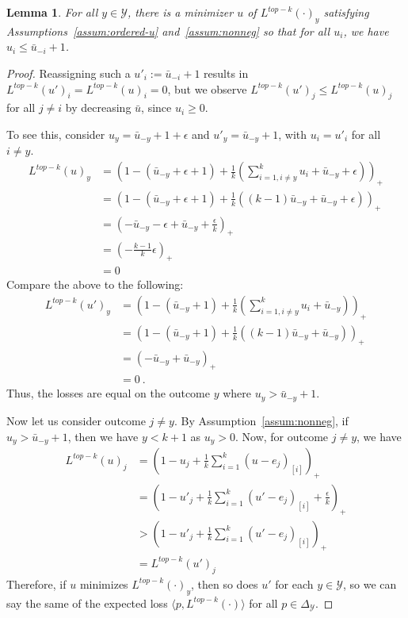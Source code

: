 \documentclass[12pt]{article}
\newcommand{\ubar}{\bar{u}}
\newcommand{\simplex}{\Delta_\Y}
\newcommand{\Y}{\mathcal{Y}}
\newcommand{\inprod}[2]{\langle #1, #2 \rangle}%
\newtheorem{lemma}{Lemma}
\begin{document}
\begin{lemma}\label{lem:top-threshold}
	For all $y \in \Y$, there is a minimizer $u$ of $L^{top-k}(\cdot)_y$ satisfying Assumptions~\ref{assum:ordered-u} and~\ref{assum:nonneg} so that for all $u_i$, we have $u_i \leq \bar u_{-i} +1$. 
\end{lemma}
\begin{proof}
	Reassigning such a $u'_i := \bar u_{-i} +1$ results in $L^{top-k}(u')_i = L^{top-k}(u)_i = 0$, but we observe $L^{top-k}(u')_j \leq L^{top-k}(u)_j$ for all $j \neq i$ by decreasing $\ubar$, since $u_i \geq 0$.

To see this, consider $u_y = \bar u_{-y} + 1 + \epsilon$ and $u'_y = \bar u_{-y} + 1$, with $u_i = u'_i$ for all $i \neq y$. 
\begin{align*}
L^{top-k}(u)_y &= \left(1 - (\bar u_{-y} + \epsilon + 1) + \frac 1 k \left(\sum_{i=1, i \neq y}^k u_i + \bar u_{-y} + \epsilon\right) \right)_+\\ 
&= \left(1 - (\bar u_{-y} + \epsilon + 1) + \frac 1 k \left((k-1) \bar u_{-y} + \bar u_{-y} + \epsilon\right) \right)_+\\
&= \left(-\bar u_{-y} - \epsilon + \bar u_{-y} + \frac \epsilon k \right)_+ \\
&= (-\frac{k-1}{k}\epsilon)_+\\
&= 0
\end{align*}
Compare the above to the following:
\begin{align*}
L^{top-k}(u')_y &= \left(1 - (\bar u_{-y} + 1) + \frac 1 k \left(\sum_{i=1, i \neq y}^k u_i + \bar u_{-y} \right) \right)_+\\ 
&= \left(1 - (\bar u_{-y} + 1) + \frac 1 k \left((k-1) \bar u_{-y} + \bar u_{-y} \right) \right)_+\\
&= \left(-\bar u_{-y} + \bar u_{-y}\right)_+ \\
&= 0~.~
\end{align*}
Thus, the losses are equal on the outcome $y$ where $u_y > \bar u_{-y} + 1$.

Now let us consider outcome $j \neq y$.
By Assumption~\ref{assum:nonneg}, if $u_y > \bar u_{-y} + 1$, then we have $y < k+1$ as $u_y > 0$.
Now, for outcome $j \neq y$, we have 
\begin{align*}
L^{top-k}(u)_j &= \left( 1 - u_j + \frac 1 k \sum_{i=1}^k (u-e_j)_{[i]} \right)_+\\
	&= \left( 1 - u'_j + \frac 1 k \sum_{i=1}^k (u'-e_j)_{[i]} + \frac {\epsilon}{k}\right)_+\\
	&> \left( 1 - u'_j + \frac 1 k \sum_{i=1}^k (u'-e_j)_{[i]}\right)_+\\
	&= L^{top-k}(u')_j
\end{align*}
Therefore, if $u$ minimizes $L^{top-k}(\cdot)_y$, then so does $u'$ for each $y \in \Y$, so we can say the same of the expected loss $\inprod{p}{L^{top-k}(\cdot)}$ for all $p \in \simplex$.
\end{proof}
\end{document}
